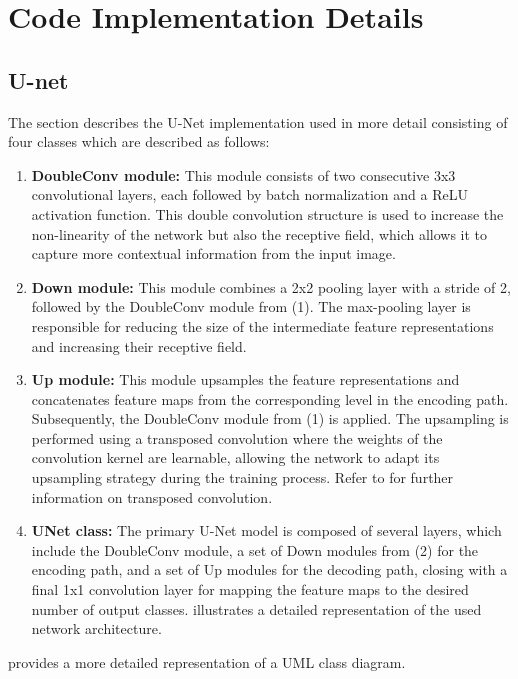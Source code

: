 \chapter{Code Implementation Details}
\section{U-net}
\label{sec:unet}
The section describes the U-Net implementation used in more detail consisting of four classes which are described as follows:
\begin{enumerate}
  \item \textbf{DoubleConv module:} This module consists of two consecutive 3x3 convolutional layers, each followed by batch normalization and a ReLU activation function. This double convolution structure is used to increase the non-linearity of the network but also the receptive field, which allows it to capture more contextual information from the input image.
  \item \textbf{Down module:} This module combines a 2x2 pooling layer with a stride of 2, followed by the DoubleConv module from (1). The max-pooling layer is responsible for reducing the size of the intermediate feature representations and increasing their receptive field.
  \item \textbf{Up module:} This module upsamples the feature representations and concatenates feature maps from the corresponding level in the encoding path. Subsequently, the DoubleConv module from (1) is applied. The upsampling is performed using a transposed convolution where the weights of the convolution kernel are learnable, allowing the network to adapt its upsampling strategy during the training process. Refer to \cite{8618415} for further information on transposed convolution.
  \item \textbf{UNet class:} The primary U-Net model is composed of several layers, which include the DoubleConv module, a set of Down modules from (2) for the encoding path, and a set of Up modules for the decoding path, closing with a final 1x1 convolution layer for mapping the feature maps to the desired number of output classes.  illustrates a detailed representation of the used network architecture.
\end{enumerate}
 provides a more detailed representation of a UML class diagram.
